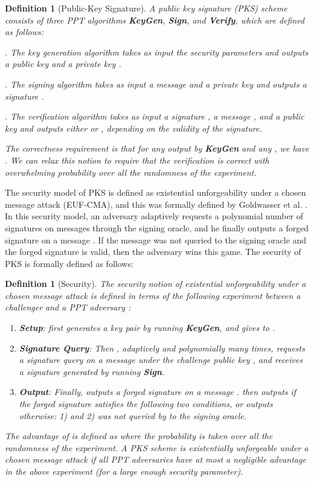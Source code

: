\documentclass[11pt,letterpaper]{article}
\newtheorem{definition}[theorem]{Definition}
\newcommand{\tb}[1]{\textbf{#1}}
\begin{document}
\begin{definition}[Public-Key Signature]
A public key signature (PKS) scheme consists of three PPT algorithms
\tb{KeyGen}, \tb{Sign}, and \tb{Verify}, which are defined as follows:
\begin{description}
\item . The key generation algorithm takes as
    input the security parameters  and outputs a public key
     and a private key .

\item . The signing algorithm takes as input a message
     and a private key  and outputs a signature .

\item . The verification algorithm takes as
    input a signature , a message , and a public key  and
    outputs either  or , depending on the validity of the signature.
\end{description}
The correctness requirement is that for any  output by \tb{KeyGen}
and any , we have . We can relax this notion to require that the verification is
correct with overwhelming probability over all the randomness of the
experiment.
\end{definition}

The security model of PKS is defined as existential unforgeability under a
chosen message attack (EUF-CMA), and this was formally defined by Goldwasser
et al. \cite{GoldwasserMR88}. In this security model, an adversary adaptively
requests a polynomial number of signatures on messages through the signing
oracle, and he finally outputs a forged signature on a message . If the
message  was not queried to the signing oracle and the forged signature
is valid, then the adversary wins this game. The security of PKS is formally
defined as follows:

\begin{definition}[Security]
The security notion of existential unforgeability under a chosen message
attack is defined in terms of the following experiment between a challenger
 and a PPT adversary :
\begin{enumerate}
\item \tb{Setup}:  first generates a key pair  by running
    \tb{KeyGen}, and gives  to .

\item \tb{Signature Query}: Then , adaptively and polynomially
    many times, requests a signature query on a message  under the
    challenge public key , and receives a signature 
    generated by running \tb{Sign}.

\item \tb{Output}: Finally,  outputs a forged signature
     on a message .  then outputs  if the
    forged signature satisfies the following two conditions, or outputs
     otherwise: 1)  and 2) 
    was not queried by  to the signing oracle.
\end{enumerate}
The advantage of  is defined as  where the probability is taken over all the randomness of the
experiment. A PKS scheme is existentially unforgeable under a chosen message
attack if all PPT adversaries have at most a negligible advantage in the
above experiment (for a large enough security parameter).
\end{definition}
\end{document}
